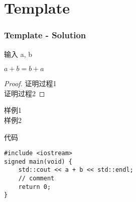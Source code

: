 \section{Template}
\begin{frame}
\frametitle{Template - Solution}
\begin{block}{输入}
    a, b
\end{block}
\begin{theorem}
    $a + b = b + a$
\end{theorem}
\begin{proof}
    证明过程1 \\
    证明过程2
\end{proof}
\end{frame}

\begin{frame}[fragile]
\begin{example}
    样例1 \\
    样例2
\end{example}
\begin{block}{代码}
\begin{lstlisting}
#include <iostream>
signed main(void) {
    std::cout << a + b << std::endl;
    // comment
    return 0;
}
\end{lstlisting}
\end{block}
\end{frame}